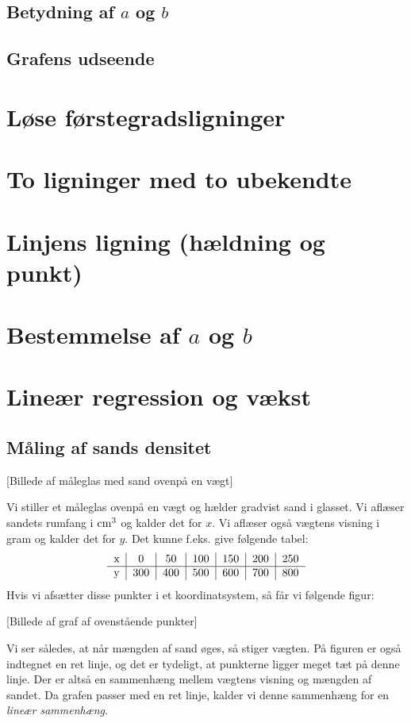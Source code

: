 \documentclass[12pt,oneside,a4paper]{article}
\begin{document}
\subsection{Betydning af $a$ og $b$}
\subsection{Grafens udseende}
\section{Løse førstegradsligninger}
\section{To ligninger med to ubekendte}
\section{Linjens ligning (hældning og punkt)}
\section{Bestemmelse af $a$ og $b$}
\section{Lineær regression og vækst}
\subsection{Måling af sands densitet}
[Billede af måleglas med sand ovenpå en vægt]

Vi stiller et måleglas ovenpå en vægt og hælder gradvist sand i glasset. Vi
aflæser sandets rumfang i ${\rm cm}^3$ og kalder det for $x$. Vi aflæser også
vægtens visning i gram og kalder det for $y$. Det kunne f.eks. give følgende
tabel:
$$
\begin{tabular}{c|c|c|c|c|c|c}
    x &   0 &  50 & 100 & 150 & 200 & 250 \\
    \hline
    y & 300 & 400 & 500 & 600 & 700 & 800
\end{tabular}
$$
Hvis vi afsætter disse punkter i et koordinatsystem, så får vi følgende figur:

[Billede af graf af ovenstående punkter]

Vi ser således, at når mængden af sand øges, så stiger vægten. 
På figuren er også indtegnet en ret linje, og det er tydeligt, at punkterne
ligger meget tæt på denne linje.  Der er altså en sammenhæng mellem vægtens
visning og mængden af sandet. Da grafen passer med en ret linje, kalder vi
denne sammenhæng for en {\em lineær sammenhæng}.
\end{document}
